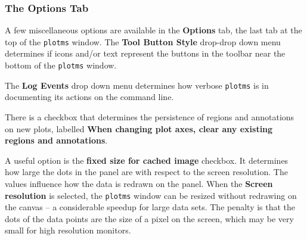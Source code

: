 %
%
%


\subsubsection{The Options Tab}
\label{section:edit.plot.plotms.options}

A few miscellaneous options are available in the {\bf Options} tab,
the last tab at the top of the {\tt plotms} window. 
 The {\bf Tool Button Style} drop-drop down menu determines if icons and/or text represent the buttons in the toolbar near the bottom of the {\tt plotms} window. 

The {\bf Log Events} drop down menu determines how verbose {\tt plotms} is in documenting its actions on the command line.

There is a checkbox that determines the persistence of regions and annotations on new plots, labelled {\bf When changing plot axes, clear any existing regions and annotations}.

A useful option is the {\bf fixed size for cached image}
checkbox. It determines how large the dots in the panel are with
respect to the screen resolution. The values influence how the data
is redrawn on the panel. When the {\bf Screen resolution} is selected,
the {\tt plotms} window can be resized without redrawing on
the canvas -- a considerable speedup for large data sets. The penalty is
that the dots of the data points are the size of a pixel on the
screen, which may be very small for high resolution monitors. 

